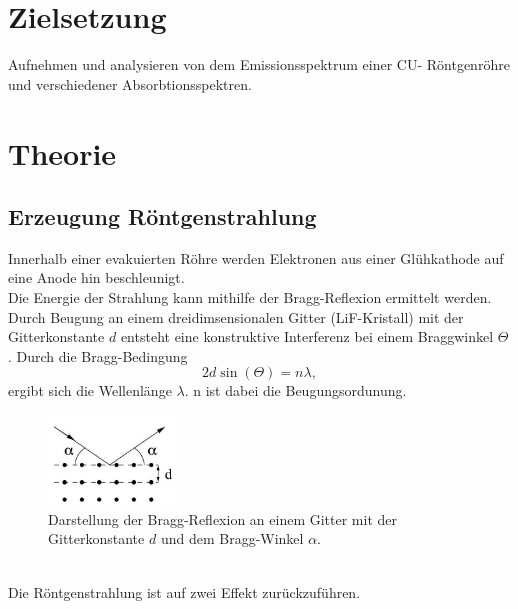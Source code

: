 \newpage
\section*{Zielsetzung}
Aufnehmen und analysieren von dem Emissionsspektrum einer CU-
Röntgenröhre und verschiedener Absorbtionsspektren.
\section{Theorie}
\subsection{Erzeugung Röntgenstrahlung}
Innerhalb einer evakuierten Röhre werden Elektronen aus einer Glühkathode
auf eine Anode hin beschleunigt.\\ 
Die Energie der Strahlung kann mithilfe der Bragg-Reflexion ermittelt werden.
Durch Beugung an einem dreidimsensionalen Gitter (LiF-Kristall) mit der Gitterkonstante $d$ 
entsteht eine konstruktive Interferenz bei einem Braggwinkel $\Theta$. Durch die Bragg-Bedingung
\begin{equation}
    2 d \sin(\Theta)=n\lambda,
    \label{eqn:bragg}
\end{equation}
ergibt sich die Wellenlänge $\lambda$. n ist dabei die Beugungsordunung.
\begin{figure}
    \centering
    \includegraphics[width=0.3\textwidth]{plots/bragg.jpg}
    \caption{Darstellung der Bragg-Reflexion an einem Gitter mit der
    Gitterkonstante $d$ und dem Bragg-Winkel $\alpha$.\cite[3]{anleitung}}
\end{figure}
\\Die Röntgenstrahlung ist auf zwei Effekt zurückzuführen.


